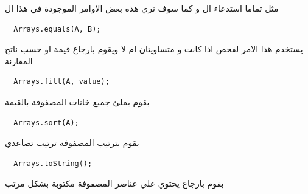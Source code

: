 \begin{AR}
مثل تماما استدعاء ال  و كما سوف نري هذه بعض الاوامر الموجودة في هذا ال
\end{AR}
\begin{verbatim}
  Arrays.equals(A, B);
\end{verbatim}
\begin{AR}
  يستخدم هذا الامر لفحص اذا كانت  و  متساويتان ام لا ويقوم بارجاع قيمة  او  حسب ناتج المقارنة
\end{AR}
\begin{verbatim}
  Arrays.fill(A, value);
\end{verbatim}
\begin{AR}
  بقوم بملئ جميع خانات المصفوفة  بالقيمة 
\end{AR}
\begin{verbatim}
  Arrays.sort(A);
\end{verbatim}
\begin{AR}
  بقوم بترتيب المصفوفة  ترتيب تصاعدي
\end{AR}
\begin{verbatim}
  Arrays.toString();
\end{verbatim}
\begin{AR}
  بقوم بارجاع  يحتوي علي عناصر المصفوفة  مكتوبة بشكل مرتب
\end{AR}

